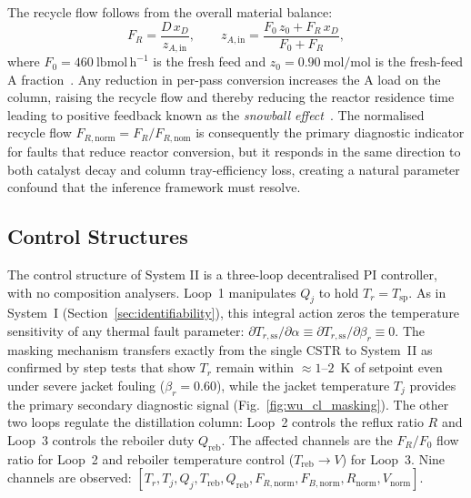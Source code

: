 \documentclass[aps,pre,twocolumn,superscriptaddress]{revtex4-2}
\begin{document}
The recycle flow follows from the overall material balance:
%
\begin{equation}
  F_R = \frac{D\,x_D}{z_{A,\mathrm{in}}},
  \qquad
  z_{A,\mathrm{in}} = \frac{F_0\,z_0 + F_R\,x_D}{F_0 + F_R},
  \label{eq:wu_recycle}
\end{equation}
%
where $F_0 = 460~\mathrm{lbmol\,h^{-1}}$ is the fresh feed and $z_0 = 0.90~\mathrm{mol/mol}$ is the fresh-feed A fraction~\citep{Wu2003}. Any reduction in per-pass conversion increases the A load on the column, raising the recycle flow and thereby reducing the reactor residence time leading to positive feedback known as the
\emph{snowball effect}~\citep{Luyben1994, Wu2003}. The normalised recycle flow $F_{R,\mathrm{norm}} = F_R/F_{R,\mathrm{nom}}$ is consequently the primary diagnostic indicator for faults that reduce reactor conversion, but it responds in the same direction to both catalyst decay and column tray-efficiency loss, creating a natural parameter confound that the inference framework must resolve.

\subsection{Control Structures}
\label{sec:wu_control}

The control structure of System II is a three-loop decentralised PI controller, with no composition analysers. Loop~1 manipulates $Q_j$ to hold $T_r = T_\mathrm{sp}$.
As in System~I (Section~\ref{sec:identifiability}), this integral action zeros the temperature sensitivity of any thermal fault parameter:
$\partial T_{r,\mathrm{ss}}/\partial\alpha \equiv \partial T_{r,\mathrm{ss}}/\partial\beta_r \equiv 0$. The masking mechanism transfers exactly from the single CSTR to System~II as confirmed by step tests that show $T_r$ remain within $\approx 1$--$2$~K of setpoint even under severe jacket fouling ($\beta_r = 0.60$), while the jacket
temperature $T_j$ provides the primary secondary diagnostic signal (Fig.~\ref{fig:wu_cl_masking}). The other two loops regulate the distillation column: Loop~2 controls the
reflux ratio $R$ and Loop~3 controls the reboiler duty $Q_\mathrm{reb}$. The affected channels are the  $F_R/F_0$ flow ratio for Loop~2 and reboiler temperature control
($T_\mathrm{reb} \to V$) for Loop~3.  Nine channels are observed: $[T_r, T_j, Q_j, T_\mathrm{reb}, Q_\mathrm{reb}, F_{R,\mathrm{norm}}, F_{B,\mathrm{norm}}, R_\mathrm{norm}, V_\mathrm{norm}]$.
\end{document}
